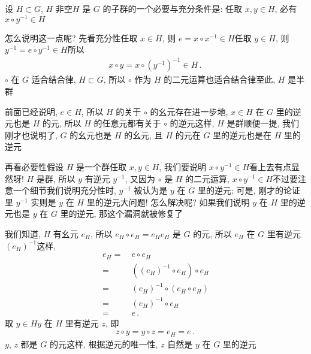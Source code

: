 \begin{remark}
    设 $H \subset G$, $H$ 非空\period $H$ 是 $G$ 的子群的一个必要与充分条件是: 任取 $x,y \in H$, 必有 $x \circ y^{-1} \in H$\period

    怎么说明这一点呢? 先看充分性\period 任取 $x \in H$, 则 $e = x \circ x^{-1} \in H$\period 任取 $y \in H$, 则 $y^{-1} = e \circ y^{-1} \in H$\period 所以
    \begin{align*}
        x \circ y = x \circ (y^{-1})^{-1} \in H \period
    \end{align*}
    $\circ$ 在 $G$ 适合结合律, $H \subset G$, 所以 $\circ$ 作为 $H$ 的二元运算也适合结合律\period 至此, $H$ 是半群\period

    前面已经说明, $e \in H$, 所以 $H$ 的关于 $\circ$ 的幺元存在\period 进一步地, $x \in H$ 在 $G$ 里的逆元也是 $H$ 的元, 所以 $H$ 的任意元都有关于 $\circ$ 的逆元\period 这样, $H$ 是群\period 顺便一提, 我们刚才也说明了, $G$ 的幺元也是 $H$ 的幺元, 且 $H$ 的元在 $G$ 里的逆元也是在 $H$ 里的逆元\period

    再看必要性\period 假设 $H$ 是一个群\period 任取 $x,y \in H$, 我们要说明 $x \circ y^{-1} \in H$\period 看上去有点显然呀! $H$ 是群, 所以 $y$ 有逆元 $y^{-1}$, 又因为 $\circ$ 是 $H$ 的二元运算, $x \circ y^{-1} \in H$\period 不过要注意一个细节\period 我们说明充分性时, $y^{-1}$ 被认为是 $y$ 在 $G$ 里的逆元; 可是, 刚才的论证里 $y^{-1}$ 实则是 $y$ 在 $H$ 里的逆元\period 大问题! 怎么解决呢? 如果我们说明 $y$ 在 $H$ 里的逆元也是 $y$ 在 $G$ 里的逆元, 那这个漏洞就被修复了\period

    我们知道, $H$ 有幺元 $e_H$, 所以 $e_H \circ e_H = e_H$\period $e_H$ 是 $G$ 的元, 所以 $e_H$ 在 $G$ 里有逆元 $(e_H)^{-1}$\period 这样,
    \begin{align*}
        e_H
        = \  & e \circ e_H                      \\
        = \  & ((e_H)^{-1} \circ e_H) \circ e_H \\
        = \  & (e_H)^{-1} \circ (e_H \circ e_H) \\
        = \  & (e_H)^{-1} \circ e_H             \\
        = \  & e \period
    \end{align*}
    取 $y \in H$\period $y$ 在 $H$ 里有逆元 $z$, 即
    \begin{align*}
        z \circ y = y \circ z = e_H = e\period
    \end{align*}
    $y$, $z$ 都是 $G$ 的元\period 这样, 根据逆元的唯一性, $z$ 自然是 $y$ 在 $G$ 里的逆元\period
\end{remark}

